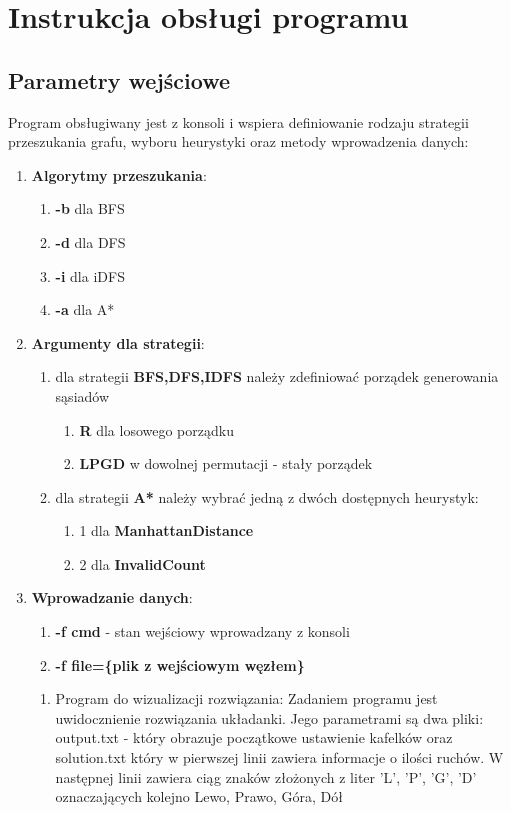 \documentclass{classrep}
\begin{document}
	\section{Instrukcja obsługi programu}
		\subsection{Parametry wejściowe}
			Program obsługiwany jest z konsoli i wspiera definiowanie rodzaju strategii przeszukania grafu,
			wyboru heurystyki oraz metody wprowadzenia danych:
			\begin{enumerate}
				\item \textbf{Algorytmy przeszukania}:
				\begin{enumerate}
					\item \textbf{-b} dla BFS
					\item \textbf{-d} dla DFS
					\item \textbf{-i} dla iDFS
					\item \textbf{-a} dla A*
				\end{enumerate}
				\item \textbf{Argumenty dla strategii}:
				\begin{enumerate}
					\item dla strategii \textbf{BFS,DFS,IDFS} należy zdefiniować porządek generowania sąsiadów
					\begin{enumerate}
						\item \textbf{R} dla losowego porządku
						\item \textbf{LPGD} w dowolnej permutacji - stały porządek
					\end{enumerate}
					\item dla strategii \textbf{A*} należy wybrać jedną z dwóch dostępnych heurystyk:
					\begin{enumerate}
						\item 1 dla \textbf{ManhattanDistance}
						\item 2 dla \textbf{InvalidCount}
					\end{enumerate}
				\end{enumerate}
				\item \textbf{Wprowadzanie danych}:
				\begin{enumerate}
					\item \textbf{-f cmd} - stan wejściowy wprowadzany z konsoli
					\item \textbf{-f file=\{plik z wejściowym węzłem\}}
				\end{enumerate}
				\begin{enumerate}
					\item Program do wizualizacji rozwiązania:
					Zadaniem programu jest uwidocznienie rozwiązania układanki. Jego parametrami są dwa pliki: output.txt - który obrazuje początkowe ustawienie kafelków oraz solution.txt który w pierwszej linii zawiera informacje o ilości ruchów. W następnej linii zawiera ciąg znaków złożonych z liter 'L', 'P', 'G', 'D' oznaczających kolejno Lewo, Prawo, Góra, Dół 
				\end{enumerate}
			\end{enumerate}
\end{document}
